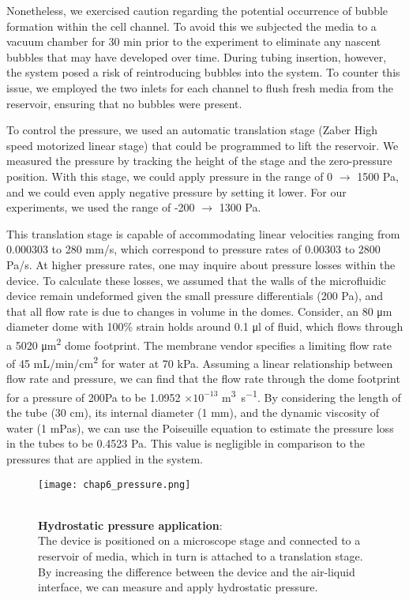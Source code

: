 Nonetheless, we exercised caution regarding the potential occurrence of bubble formation within the cell channel. To avoid this we subjected the media to a vacuum chamber for 30 \unit{\minute} prior to the experiment to eliminate any nascent bubbles that may have developed over time. During tubing insertion, however, the system posed a risk of reintroducing bubbles into the system. To counter this issue, we employed the two inlets for each channel to flush fresh media from the reservoir, ensuring that no bubbles were present.

To control the pressure, we used an automatic translation stage (Zaber High speed motorized linear stage) that could be programmed to lift the reservoir. We measured the pressure by tracking the height of the stage and the zero-pressure position. With this stage, we could apply pressure in the range of 0 $\rightarrow$ 1500 \unit{\pascal}, and we could even apply negative pressure by setting it lower. For our experiments, we used the range of -200 $\rightarrow$ 1300 \unit{\pascal}.

This translation stage is capable of accommodating linear velocities ranging from 0.000303 to 280 \unit{mm/s}, which correspond to pressure rates of 0.00303 to 2800 \unit{Pa/s}. At higher pressure rates, one may inquire about pressure losses within the device. To calculate these losses, we assumed that the walls of the microfluidic device remain undeformed given the small pressure differentials (200 Pa), and that all flow rate is due to changes in volume in the domes. Consider, an 80 \unit{\um} diameter dome with 100\% strain holds around 0.1 \unit{\ul} of fluid, which flows through a 5020 \unit{\micro\meter\squared} dome footprint. The membrane vendor specifies a limiting flow rate of 45 \unit{mL/min/cm^2} for water at 70 kPa. Assuming a linear relationship between flow rate and pressure, we can find that the flow rate through the dome footprint for a pressure of 200Pa to be 1.0952 $\times 10^{-13}$ \unit{\cubic\meter\per\second}. By considering the length of the tube (30 cm), its internal diameter (1 mm), and the dynamic viscosity of water (1 mPas), we can use the Poiseuille equation to estimate the pressure loss in the tubes to be 0.4523 Pa. This value is negligible in comparison to the pressures that are applied in the system.

\begin{figure}
	\begin{minipage}[c]{0.6\textwidth}
		\texttt{[image: chap6\_pressure.png]}
	\end{minipage}\hfill
	\begin{minipage}[c]{0.35\textwidth}
		\caption{\\ \textbf{Hydrostatic pressure application}:\\ The device is positioned on a microscope stage and connected to a reservoir of media, which in turn is attached to a translation stage. By increasing the difference between the device and the air-liquid interface, we can measure and apply hydrostatic pressure.
		} \label{fig_6_3}
	\end{minipage}
\end{figure}


